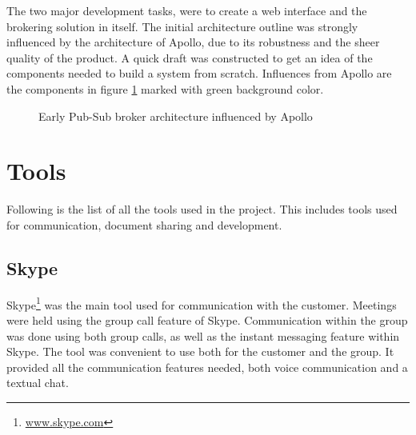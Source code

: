The two major development tasks, were to create a web interface and the brokering solution in itself. The initial architecture outline was strongly influenced by the architecture of Apollo, due to its robustness and the sheer quality of the product. A quick draft was constructed to get an idea of the components needed to build a system from scratch. Influences from Apollo are the components in figure \ref{fig:arch_proposal} marked with green background color.

\begin{center}
  \begin{figure}[ht!]
    \caption{Early Pub-Sub broker architecture influenced by Apollo}
    \label{fig:arch_proposal}
  \end{figure}
\end{center}

\section{Tools}
\label{sec:prestudies-tools}

Following is the list of all the tools used in the project. This includes tools used for communication, document sharing and development.

\subsection{Skype}
\label{subsec:prestudies-tools-skype}

Skype\footnote{\url{www.skype.com}} was the main tool used for communication with the customer. Meetings were held using the group call feature of Skype. Communication within the group was done using both group calls, as well as the instant messaging feature within Skype. The tool was convenient to use both for the customer and the group. It provided all the communication features needed, both voice communication and a textual chat.


